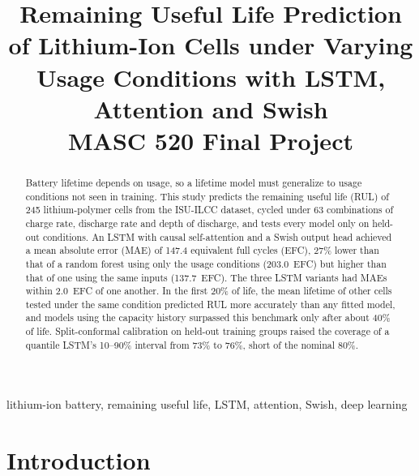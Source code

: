 \documentclass[conference]{IEEEtran}
\begin{document}
\title{Remaining Useful Life Prediction of Lithium-Ion Cells under Varying Usage Conditions with LSTM, Attention and Swish\\
\large MASC 520 Final Project}

\author{
}

\maketitle

\begin{abstract}
Battery lifetime depends on usage, so a lifetime model must generalize to usage conditions not seen in training. This study predicts the remaining useful life (RUL) of 245 lithium-polymer cells from the ISU-ILCC dataset, cycled under 63 combinations of charge rate, discharge rate and depth of discharge, and tests every model only on held-out conditions. An LSTM with causal self-attention and a Swish output head achieved a mean absolute error (MAE) of 147.4 equivalent full cycles (EFC), 27\% lower than that of a random forest using only the usage conditions (203.0~EFC) but higher than that of one using the same inputs (137.7~EFC). The three LSTM variants had MAEs within 2.0~EFC of one another. In the first 20\% of life, the mean lifetime of other cells tested under the same condition predicted RUL more accurately than any fitted model, and models using the capacity history surpassed this benchmark only after about 40\% of life. Split-conformal calibration on held-out training groups raised the coverage of a quantile LSTM's 10--90\% interval from 73\% to 76\%, short of the nominal 80\%.
\end{abstract}

\begin{IEEEkeywords}
lithium-ion battery, remaining useful life, LSTM, attention, Swish, deep learning
\end{IEEEkeywords}

\section{Introduction}
\end{document}
